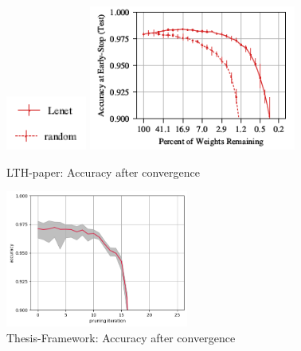\begin{figure}
	\begin{minipage}{\textwidth}
		\centering
		\includegraphics[width=100px]{gfx/7-Evaluation/LTH_3_legend.png}
	\end{minipage}
	\begin{minipage}{0.5\textwidth}
		\centering
		\includegraphics[height=180px]{gfx/7-Evaluation/LTH_0.png}
		\caption*{LTH-paper: Accuracy after convergence}
		\label{?}
	\end{minipage}\hfill
	\begin{minipage}{0.5\textwidth}
		\centering
		\includegraphics[height=170px]{gfx/Experiments/Reproduction-MNIST-FCN/accuracy/converged.png}
		\caption*{Thesis-Framework: Accuracy after convergence}
		\label{?}
	\end{minipage}
\end{figure}

